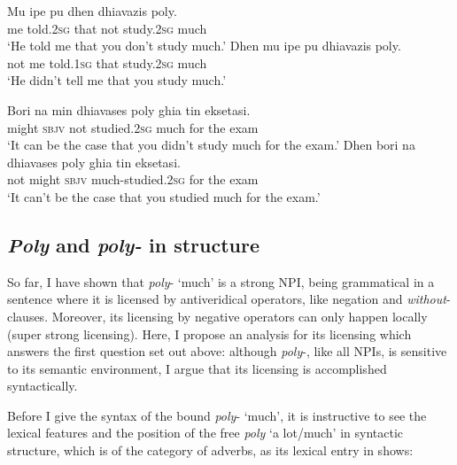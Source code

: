 \documentclass[output=paper]{langscibook}
\begin{document}
\begin{exe}
\ex\label{gia:ex22} \begin{xlist}
        \ex\label{gia:ex22a} \gll Mu ipe pu dhen dhiavazis poly. \\
        me told.\textsc{2sg} that not study.\textsc{2sg} much \\
        \trans `He told me that you don't study much.'
        \ex\label{gia:ex22b} \gll Dhen mu ipe pu dhiavazis poly. \\
        not me told.\textsc{1sg} that study.\textsc{2sg} much \\
        \trans `He didn't tell me that you study much.'
    \end{xlist}
\end{exe}

\begin{exe}
\ex\label{gia:ex23} \begin{xlist}
        \ex\label{gia:ex23a} \gll Bori na min dhiavases poly ghia tin eksetasi. \\
        might \textsc{sbjv} not studied.\textsc{2sg} much for the exam \\
        \trans `It can be the case that you didn't study much for the exam.'
        \ex\label{gia:ex23b} \gll Dhen bori na dhiavases poly ghia tin eksetasi. \\
        not might \textsc{sbjv} much-studied.\textsc{2sg} for the exam \\
        \trans `It can't be the case that you studied much for the exam.'
    \end{xlist}
\end{exe}

\subsection{\textit{Poly} and \textit{poly-} in structure} \label{gia:sub:structure}

So far, I have shown that \textit{poly}- ‘much’ is a strong NPI, being grammatical in a sentence where it is licensed by antiveridical operators, like negation and \textit{without}-clauses. Moreover, its licensing by negative operators can only happen locally (super strong licensing). Here, I propose an analysis for its licensing which answers the first question set out above: although \textit{poly}-, like all NPIs, is sensitive to its semantic environment, I argue that its licensing is accomplished syntactically.

Before I give the syntax of the bound \textit{poly}- ‘much’, it is instructive to see the lexical features and the position of the free \textit{poly} ‘a lot/much’ in syntactic structure, which is of the category of adverbs, as its lexical entry in  shows:
\end{document}
